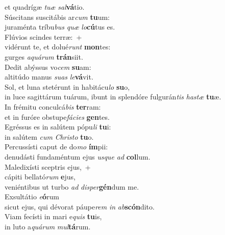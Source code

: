 \oddverse et quadrígæ \textit{tu}\textit{æ} \textit{sal}\textbf{vá}tio.\\
\evenverse Súscitans suscitábis ar\textit{cum} \textbf{tu}um:~\*\\
\evenverse juraménta tríbu\textit{bus} \textit{quæ} \textit{lo}\textbf{cú}tus es.\\
\oddverse Flúvios scindes terræ:~+\\
\oddverse  vidérunt te, et dolué\textit{runt} \textbf{mon}tes:~\*\\
\oddverse gurges \textit{a}\textit{quá}\textit{rum} \textbf{trán}siit.\\
\evenverse Dedit abýssus vo\textit{cem} \textbf{su}am:~\*\\
\evenverse altitúdo manus \textit{su}\textit{as} \textit{le}\textbf{vá}vit.\\
\oddverse Sol, et luna stetérunt in habitácu\textit{lo} \textbf{su}o,~\*\\
\oddverse in luce sagittárum tuárum, ibunt in splendóre fulgurán\textit{tis} \textit{ha}\textit{stæ} \textbf{tu}æ.\\
\evenverse In frémitu conculcá\textit{bis} \textbf{ter}ram:~\*\\
\evenverse et in furóre obstupe\textit{fá}\textit{ci}\textit{es} \textbf{gen}tes.\\
\oddverse Egréssus es in salútem pópu\textit{li} \textbf{tu}i:~\*\\
\oddverse in salútem \textit{cum} \textit{Chri}\textit{sto} \textbf{tu}o.\\
\evenverse Percussísti caput de do\textit{mo} \textbf{ím}pii:~\*\\
\evenverse denudásti fundaméntum ejus \textit{us}\textit{que} \textit{ad} \textbf{col}lum.\\
\oddverse Maledixísti sceptris ejus,~+\\
\oddverse  cápiti bellató\textit{rum} \textbf{e}jus,~\*\\
\oddverse veniéntibus ut turbo \textit{ad} \textit{di}\textit{sper}\textbf{gén}dum me.\\
\evenverse Exsultátio \textit{e}\textbf{ó}rum~\*\\
\evenverse sicut ejus, qui dévorat páupe\textit{rem} \textit{in} \textit{ab}\textbf{scón}dito.\\
\oddverse Viam fecísti in mari e\textit{quis} \textbf{tu}is,~\*\\
\oddverse in luto a\textit{quá}\textit{rum} \textit{mul}\textbf{tá}rum.\\
